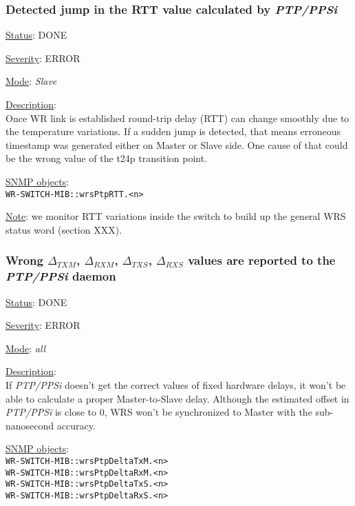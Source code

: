 \subsubsection{\bf Detected jump in the RTT value calculated by \emph{PTP/PPSi}}
		\label{fail:timing:rtt_jump}
		\begin{packed_enum}
			\item [] \underline{Status}: DONE
			\item [] \underline{Severity}: ERROR
			\item [] \underline{Mode}: \emph{Slave}
			\item [] \underline{Description}:\\
				Once WR link is established round-trip delay (RTT) can change smoothly
				due to the temperature variations. If a sudden jump is detected, that
				means erroneous timestamp was generated either on Master or Slave side.
				One cause of that could be the wrong value of the t24p transition point.
			\item [] \underline{SNMP objects}:\\
				\texttt{WR-SWITCH-MIB::wrsPtpRTT.<n>}
			\item [] \underline{Note}: we  monitor RTT variations inside
				the switch to build up the general WRS status word (section XXX).
		\end{packed_enum}

\subsubsection{\bf Wrong $\Delta_{TXM}$, $\Delta_{RXM}$, $\Delta_{TXS}$,
		$\Delta_{RXS}$ values are reported to the \emph{PTP/PPSi} daemon}
		\label{fail:timing:deltas_report}
		\begin{packed_enum}
			\item [] \underline{Status}: DONE
			\item [] \underline{Severity}: ERROR
			\item [] \underline{Mode}: \emph{all}
			\item [] \underline{Description}:\\
				If \emph{PTP/PPSi} doesn't get the correct values of fixed hardware delays,
				it won't be able to calculate a proper Master-to-Slave delay. Although
				the estimated offset in \emph{PTP/PPSi} is close to 0, WRS won't be
				synchronized to Master with the sub-nanosecond accuracy.
			\item [] \underline{SNMP objects}:\\
				\texttt{WR-SWITCH-MIB::wrsPtpDeltaTxM.<n>}\\
				\texttt{WR-SWITCH-MIB::wrsPtpDeltaRxM.<n>}\\
				\texttt{WR-SWITCH-MIB::wrsPtpDeltaTxS.<n>}\\
				\texttt{WR-SWITCH-MIB::wrsPtpDeltaRxS.<n>}
		\end{packed_enum}

